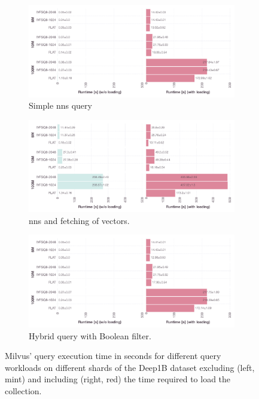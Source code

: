 \begin{figure}[p]
    \centering
    \begin{subfigure}[b]{\textwidth}
        \centering
        \includegraphics[width=\textwidth]{figures/bignns/milvus/bignns-milvus-NNS.pdf}
        \caption{Simple \acrshort{nns} query}
        \label{figure:milvus_nns_runtime}
    \end{subfigure}
    \hfill
    \centering
    \begin{subfigure}[b]{\textwidth}
        \centering
        \includegraphics[width=\textwidth]{figures/bignns/milvus/bignns-milvus-NNS + Fetch}
        \caption{\acrshort{nns} and fetching of vectors.}
        \label{figure:milvus_nns_fetch_runtime}
    \end{subfigure}
    \hfill
    \centering
    \begin{subfigure}[b]{\textwidth}
        \centering
        \includegraphics[width=\textwidth]{figures/bignns/milvus/bignns-milvus-Hybrid}
        \caption{Hybrid query with Boolean filter.}
        \label{figure:milvus_hybrid_runtime}
    \end{subfigure}
    \caption{Milvus' query execution time in seconds for different query workloads on different shards of the Deep1B dataset excluding (left, mint) and including (right, red) the time required to load the collection.}
    \label{figure:milvus_runtime_runtime}
\end{figure}

